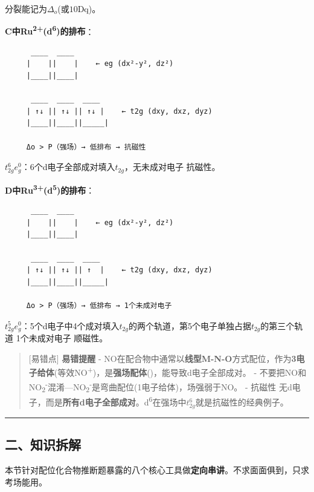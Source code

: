 分裂能记为\(\Delta_o\)(或\(10\text{Dq}\))。

\textbf{C中Ru\textsuperscript{2+}(d\textsuperscript{6})的排布}：

\begin{verbatim}
      ____  ____
     |    ||    |    ← eg (dx²-y², dz²)
     |____||____|
                    
      ____  ____  ____
     | ↑↓ || ↑↓ || ↑↓ |    ← t2g (dxy, dxz, dyz)
     |____||____||_____|
     
     Δo > P（强场）→ 低排布 → 抗磁性
\end{verbatim}

\(t_{2g}^{6}e_{g}^{0}\)：6个d电子全部成对填入\(t_{2g}\)，无未成对电子 \箭 抗磁性。

\textbf{D中Ru\textsuperscript{3+}(d\textsuperscript{5})的排布}：

\begin{verbatim}
      ____  ____
     |    ||    |    ← eg (dx²-y², dz²)
     |____||____|
                    
      ____  ____  ____
     | ↑↓ || ↑↓ || ↑  |    ← t2g (dxy, dxz, dyz)
     |____||____||_____|     
     
     Δo > P（强场）→ 低排布 → 1个未成对电子
\end{verbatim}

\(t_{2g}^{5}e_{g}^{0}\)：5个d电子中4个成对填入\(t_{2g}\)的两个轨道，第5个电子单独占据\(t_{2g}\)的第三个轨道 \箭 1个未成对电子 \箭 顺磁性。

\begin{quote}
{[}易错点{]} \textbf{易错提醒}
- NO在配合物中通常以\textbf{线型M-N-O}方式配位，作为\textbf{3电子给体}(等效NO\textsuperscript{+})，是\textbf{强场配体}()，能导致d电子全部成对。
- 不要把NO和NO\textsubscript{2}\textsuperscript{-}混淆---NO\textsubscript{2}\textsuperscript{-}是弯曲配位(1电子给体)，场强弱于NO。
- 抗磁性  无d电子，而是\textbf{所有d电子全部成对}。d\textsuperscript{6}在强场中\(t_{2g}^{6}\)就是抗磁性的经典例子。
\end{quote}

\begin{center}\rule{0.5\linewidth}{0.5pt}\end{center}

\subsection{二、知识拆解}\label{ux4e8cux77e5ux8bc6ux62c6ux89e3-4}

本节针对配位化合物推断题暴露的八个核心工具做\textbf{定向串讲}。不求面面俱到，只求考场能用。

